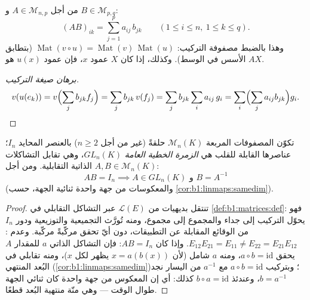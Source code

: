 \begin{definition}[الجداء]\label{def:b1:matrices:product}
من أجل $A \in \mathcal{M}_{n,p}$ و $B \in \mathcal{M}_{p,q}$:
\[
(AB)_{ik} = \sum_{j=1}^{p} a_{ij}\, b_{jk}
\qquad (1 \leq i \leq n,\ 1 \leq k \leq q).
\]
وهذا بالضبط مصفوفة التركيب:
$\operatorname{Mat}(v \circ u) = \operatorname{Mat}(v)\,
\operatorname{Mat}(u)$ (بتطابق الأسس في الوسط). وكذلك،
إذا كان $X$ عمود  $x$، فإن عمود $u(x)$ هو
$AX$.
\end{definition}

\begin{proof}[برهان صيغة التركيب]
\[
v(u(e_k)) = v\Bigl(\sum_j b_{jk} f_j\Bigr) = \sum_j b_{jk}\, v(f_j)
= \sum_j b_{jk} \sum_i a_{ij}\, g_i
= \sum_i \Bigl(\sum_j a_{ij} b_{jk}\Bigr) g_i . \qedhere
\]
\end{proof}

\begin{proposition}\label{prop:b1:matrices:ring}
تكوّن المصفوفات المربعة $\mathcal{M}_n(K)$ حلقةً (غير  من أجل $n
\geq 2$) بالعنصر المحايد $I_n$؛  عناصرها القابلة للقلب هي
\emph{الزمرة الخطية العامة}
$GL_n(K)$، وهي تقابل التشاكلات الذاتية التقابلية. ومن أجل $A, B \in
\mathcal{M}_n(K)$:
\[
AB = I_n \implies A \in GL_n(K) \text{ و } B = A^{-1}
\]
(والمعكوسات من جهة واحدة ثنائية الجهة، حسب
\cref{cor:b1:linmaps:samedim}).
\end{proposition}

\begin{proof}
تنتقل بديهيات  من $\mathcal{L}(E)$ عبر
التشاكل التقابلي في \cref{def:b1:matrices:def}: فهو يحوّل
التركيب إلى جداء والمجموع إلى مجموع، ومنه تُورَّث التجميعية
والتوزيعية ودور $I_n$ من الوقائع المقابلة عن
التطبيقات، دون أيّ تحقق مركّبةً مركّبة.
وعدم : $E_{12}E_{21} = E_{11} \neq E_{22}
= E_{21}E_{12}$. وإذا كان $AB = I_n$: فإن التشاكل الذاتي $a$ للمقدار $A$
يحقق $a \circ b = \mathrm{id}$، ومنه  $a$ شامل (لأن $x =
a(b(x))$ يظهر  لكل $x$)، ومنه تقابلي في
البُعد المنتهي (\cref{cor:b1:linmaps:samedim})؛ وبتركيب $a
\circ b = \mathrm{id}$ مع $a^{-1}$ من اليسار نجد $b =
a^{-1}$، وعندئذ $b\circ a = \mathrm{id}$ كذلك: أي إن المعكوس
من جهة واحدة كان ثنائي الجهة طوال الوقت --- وهي منّة
منتهية البُعد قطعًا.
\end{proof}

